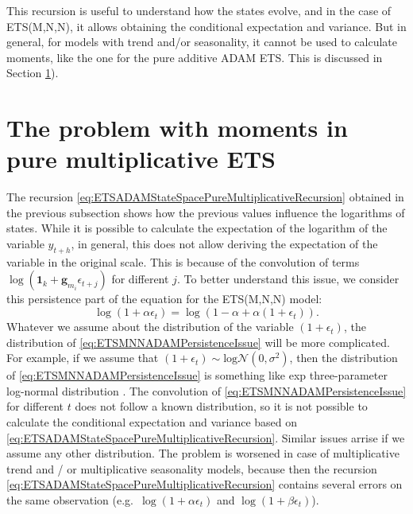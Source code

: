 \documentclass[
]{book}
\theoremstyle{definition}
\theoremstyle{definition}
\theoremstyle{definition}
\theoremstyle{definition}
\theoremstyle{remark}
\begin{document}
This recursion is useful to understand how the states evolve, and in the case of ETS(M,N,N), it allows obtaining the conditional expectation and variance. But in general, for models with trend and/or seasonality, it cannot be used to calculate moments, like the one for the pure additive ADAM ETS. This is discussed in Section \ref{pureMultiplicativeExpectationAndVariance}).

\hypertarget{pureMultiplicativeExpectationAndVariance}{%
\section{The problem with moments in pure multiplicative ETS}\label{pureMultiplicativeExpectationAndVariance}}

The recursion \eqref{eq:ETSADAMStateSpacePureMultiplicativeRecursion} obtained in the previous subsection shows how the previous values influence the logarithms of states. While it is possible to calculate the expectation of the logarithm of the variable \(y_{t+h}\), in general, this does not allow deriving the expectation of the variable in the original scale. This is because of the convolution of terms \(\log(\mathbf{1}_k + \mathbf{g}_{m_i} \epsilon_{t+j})\) for different \(j\). To better understand this issue, we consider this persistence part of the equation for the ETS(M,N,N) model:
\begin{equation}
    \log(1+\alpha\epsilon_t) = \log(1-\alpha + \alpha(1+\epsilon_t)).
  \label{eq:ETSMNNADAMPersistenceIssue}
\end{equation}
Whatever we assume about the distribution of the variable \((1+\epsilon_t)\), the distribution of \eqref{eq:ETSMNNADAMPersistenceIssue} will be more complicated. For example, if we assume that \((1+\epsilon_t)\sim\mathrm{log}\mathcal{N}(0,\sigma^2)\), then the distribution of \eqref{eq:ETSMNNADAMPersistenceIssue} is something like exp three-parameter log-normal distribution \citep{Sangal1970}. The convolution of \eqref{eq:ETSMNNADAMPersistenceIssue} for different \(t\) does not follow a known distribution, so it is not possible to calculate the conditional expectation and variance based on \eqref{eq:ETSADAMStateSpacePureMultiplicativeRecursion}. Similar issues arrise if we assume any other distribution. The problem is worsened in case of multiplicative trend and / or multiplicative seasonality models, because then the recursion \eqref{eq:ETSADAMStateSpacePureMultiplicativeRecursion} contains several errors on the same observation (e.g.~\(\log(1+\alpha\epsilon_t)\) and \(\log(1+\beta\epsilon_t)\)).
\end{document}
